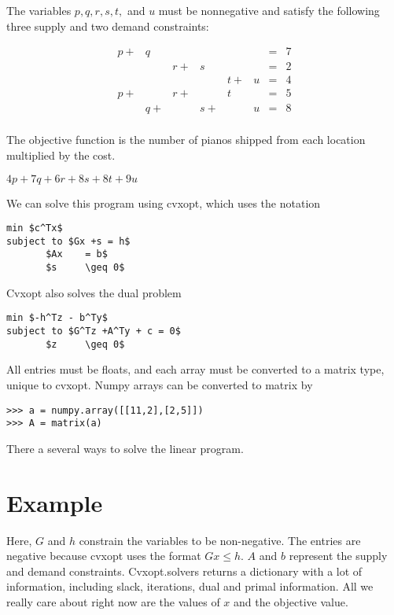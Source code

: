 The variables $p,q,r,s,t,$ and $u$ must be nonnegative and satisfy the following three supply and two demand constraints:

\begin{align}
p +& q  &    &    &    &   &=& 7\\
   &    & r +& s  &    &   &=& 2\\
   &    &    &    & t +& u &=& 4\\
p +&    & r +&    & t  &   &=& 5\\
   & q +&    & s +&    & u &=& 8\\
\end{align}

The objective function is the number of pianos shipped from each location multiplied by the cost.

\begin{center}
$4p + 7q + 6r + 8s + 8t + 9u$
\end{center}

We can solve this program using cvxopt, which uses the notation

\begin{lstlisting}[mathescape]
min $c^Tx$
subject to $Gx +s = h$
	   $Ax    = b$
	   $s     \geq 0$
\end{lstlisting}

Cvxopt also solves the dual problem

\begin{lstlisting}[mathescape]
min $-h^Tz - b^Ty$
subject to $G^Tz +A^Ty + c = 0$
	   $z     \geq 0$
\end{lstlisting}

All entries must be floats, and each array must be converted to a matrix type, unique to cvxopt.
Numpy arrays can be converted to matrix by

\begin{lstlisting}
>>> a = numpy.array([[11,2],[2,5]])
>>> A = matrix(a)
\end{lstlisting}

There a several ways to solve the linear program. 

\section*{Example}
Here, $G$ and $h$ constrain the variables to be non-negative.
The entries are negative because cvxopt uses the format $Gx \leq h$.
$A$ and $b$ represent the supply and demand constraints.
Cvxopt.solvers returns a dictionary with a lot of information, including slack, iterations, dual and primal information.
All we really care about right now are the values of $x$ and the objective value.

